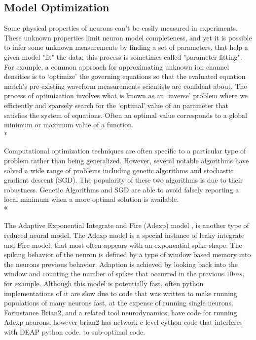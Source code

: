\subsection{Model Optimization}
%
Some physical properties of neurons can’t be easily measured in experiments. These unknown properties limit neuron model completeness, and yet it is possible to infer some unknown measurements by  finding a set of parameters, that help a given model "fit" the data, this process is sometimes called "parameter-fitting". For example, a common approach for approximating unknown ion channel densities is to ‘optimize’ the governing equations so that the evaluated equation  match's pre-existing waveform measurements scientists are confident about. The process of optimization involves what is known as an ‘inverse’ problem where we efficiently and sparsely search for the ‘optimal’ value of an parameter that satisfies the system of equations. Often an optimal value corresponds to a global minimum or maximum value of a function.\\*


Computational optimization techniques are often specific to a particular type of problem rather than being generalized. However, several notable algorithms have solved a wide range of problems including genetic algorithms and stochastic gradient descent (SGD). The popularity of these two algorithms is due to their robustness. Genetic Algorithms and SGD are able to avoid falsely reporting a local minimum when a more optimal solution is available.\\*

The Adaptive Exponential Integrate and Fire (Adexp) model \cite{brette2005adaptive}, is another type of reduced neural model. The Adexp model is a special instance of leaky integrate and Fire model, that most often appears with an exponential spike shape. The spiking behavior of the neuron is defined by a type of window based memory into the neurons previous behavior. Adaption is achieved by looking back into the window and counting the number of spikes that occurred in the previous $10ms$, for example. Although this model is potentially fast, often python implementations of it are slow due to code that was written to make running populations of many neurons fast, at the expense of running single neurons. Forinstance Brian2, and a related tool neurodynamics, have code for running Adexp neurons, however brian2 has network c-level cython code that interferes with DEAP python code. 
to sub-optimal code.\\
\\


